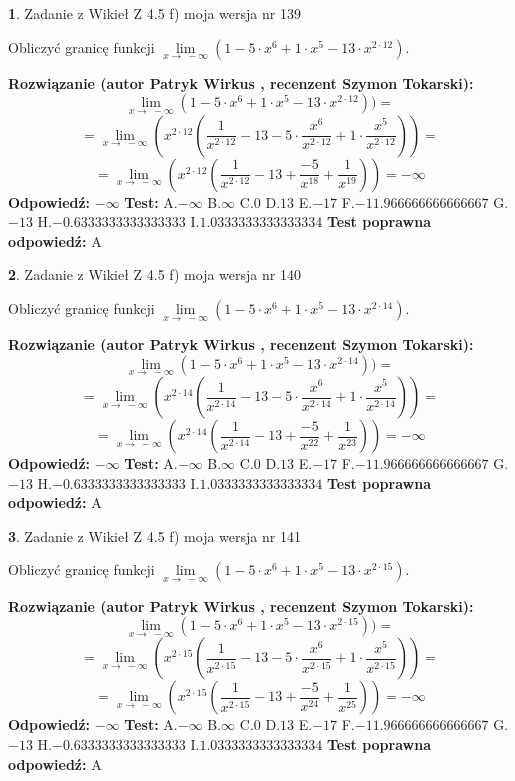\documentclass[12pt, a4paper]{article}
\theoremstyle{definition} %
\newtheorem{zad}{}
\newcommand{\zadStart}[1]{\begin{zad}#1\newline}
\newcommand{\zadStop}{\end{zad}}
\newcommand{\rozwStart}[2]{\noindent \textbf{Rozwiązanie (autor #1 , recenzent #2): }\newline}
\newcommand{\rozwStop}{\newline}
\newcommand{\odpStart}{\noindent \textbf{Odpowiedź:}\newline}
\newcommand{\odpStop}{\newline}
\newcommand{\testStart}{\noindent \textbf{Test:}\newline}
\newcommand{\testStop}{\newline}
\newcommand{\kluczStart}{\noindent \textbf{Test poprawna odpowiedź:}\newline}
\newcommand{\kluczStop}{\newline}
\begin{document}
\zadStart{Zadanie z Wikieł Z 4.5 f) moja wersja nr 139}


Obliczyć granicę funkcji  $\lim\limits_{x\to\ -\infty}(1 - 5 \cdot x^{6}+1 \cdot x^{5}- 13 \cdot x^{2\cdot12})$.
\zadStop
\rozwStart{Patryk Wirkus}{Szymon Tokarski}
$$\lim\limits_{x\to\ -\infty}(1 - 5 \cdot x^{6}+1 \cdot x^{5}- 13 \cdot x^{2\cdot12}))=$$
$$=\lim\limits_{x\to\ -\infty}(x^{2\cdot12}(\frac{1}{x^{2\cdot12}}-13 -5 \cdot \frac{x^{6}}{x^{2\cdot12}}+1 \cdot \frac{x^{5}}{x^{2\cdot12}}))=$$
$$=\lim\limits_{x\to\ -\infty}(x^{2\cdot12}(\frac{1}{x^{2\cdot12}}-13 + \frac{-5}{x^{18}}+ \frac{1}{x^{19}}))=-\infty$$
\rozwStop
\odpStart
$-\infty$
\odpStop
\testStart
A.$-\infty$ B.$\infty$ C.$0$ D.$13$ E.$-17$
F.$-11.966666666666667$ G.$-13$
H.$-0.6333333333333333$
I.$1.0333333333333334$
\testStop
\kluczStart
A
\kluczStop



\zadStart{Zadanie z Wikieł Z 4.5 f) moja wersja nr 140}


Obliczyć granicę funkcji  $\lim\limits_{x\to\ -\infty}(1 - 5 \cdot x^{6}+1 \cdot x^{5}- 13 \cdot x^{2\cdot14})$.
\zadStop
\rozwStart{Patryk Wirkus}{Szymon Tokarski}
$$\lim\limits_{x\to\ -\infty}(1 - 5 \cdot x^{6}+1 \cdot x^{5}- 13 \cdot x^{2\cdot14}))=$$
$$=\lim\limits_{x\to\ -\infty}(x^{2\cdot14}(\frac{1}{x^{2\cdot14}}-13 -5 \cdot \frac{x^{6}}{x^{2\cdot14}}+1 \cdot \frac{x^{5}}{x^{2\cdot14}}))=$$
$$=\lim\limits_{x\to\ -\infty}(x^{2\cdot14}(\frac{1}{x^{2\cdot14}}-13 + \frac{-5}{x^{22}}+ \frac{1}{x^{23}}))=-\infty$$
\rozwStop
\odpStart
$-\infty$
\odpStop
\testStart
A.$-\infty$ B.$\infty$ C.$0$ D.$13$ E.$-17$
F.$-11.966666666666667$ G.$-13$
H.$-0.6333333333333333$
I.$1.0333333333333334$
\testStop
\kluczStart
A
\kluczStop



\zadStart{Zadanie z Wikieł Z 4.5 f) moja wersja nr 141}


Obliczyć granicę funkcji  $\lim\limits_{x\to\ -\infty}(1 - 5 \cdot x^{6}+1 \cdot x^{5}- 13 \cdot x^{2\cdot15})$.
\zadStop
\rozwStart{Patryk Wirkus}{Szymon Tokarski}
$$\lim\limits_{x\to\ -\infty}(1 - 5 \cdot x^{6}+1 \cdot x^{5}- 13 \cdot x^{2\cdot15}))=$$
$$=\lim\limits_{x\to\ -\infty}(x^{2\cdot15}(\frac{1}{x^{2\cdot15}}-13 -5 \cdot \frac{x^{6}}{x^{2\cdot15}}+1 \cdot \frac{x^{5}}{x^{2\cdot15}}))=$$
$$=\lim\limits_{x\to\ -\infty}(x^{2\cdot15}(\frac{1}{x^{2\cdot15}}-13 + \frac{-5}{x^{24}}+ \frac{1}{x^{25}}))=-\infty$$
\rozwStop
\odpStart
$-\infty$
\odpStop
\testStart
A.$-\infty$ B.$\infty$ C.$0$ D.$13$ E.$-17$
F.$-11.966666666666667$ G.$-13$
H.$-0.6333333333333333$
I.$1.0333333333333334$
\testStop
\kluczStart
A
\kluczStop
\end{document}
